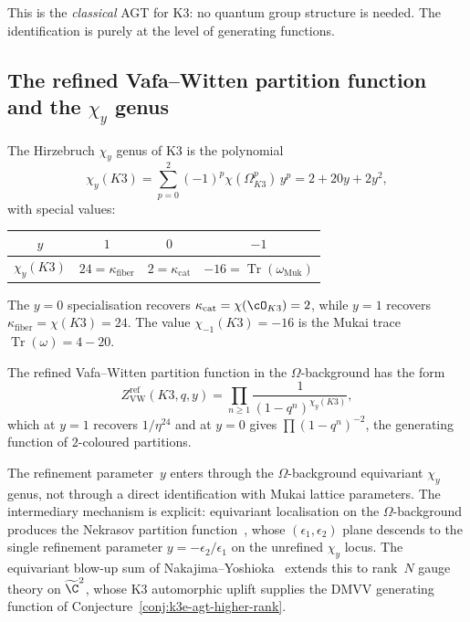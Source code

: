 \noindent This is the \emph{classical} AGT for K3: no quantum group structure is needed. The identification is purely at the level of generating functions.

\subsection{The refined Vafa--Witten partition function and the \texorpdfstring{$\chi_y$}{chi-y} genus}
\label{subsec:k3e-refined-vw}

The Hirzebruch $\chi_y$ genus of K3 is the polynomial
\begin{equation}\label{eq:k3e-chi-y}
 \chi_y(K3) = \sum_{p=0}^{2} (-1)^p \chi(\Omega^p_{K3}) \, y^p
 = 2 + 20y + 2y^2,
\end{equation}
with special values:
\begin{center}
\begin{tabular}{c|ccc}
$y$ & $1$ & $0$ & $-1$ \\ \hline
$\chi_y(K3)$ & $24 = \kappa_{\mathrm{fiber}}$ & $2 = \kappa_{\mathrm{cat}}$ & $-16 = \operatorname{Tr}(\omega_{\mathrm{Muk}})$
\end{tabular}
\end{center}
The $y = 0$ specialisation recovers $\kappa_{\mathrm{cat}} = \chi(\cO_{K3}) = 2$, while $y = 1$ recovers $\kappa_{\mathrm{fiber}} = \chi(K3) = 24$. The value $\chi_{-1}(K3) = -16$ is the Mukai trace $\operatorname{Tr}(\omega) = 4 - 20$.

The refined Vafa--Witten partition function in the $\Omega$-background has the form
\[
 Z_{\mathrm{VW}}^{\mathrm{ref}}(K3, q, y) = \prod_{n \geq 1} \frac{1}{(1 - q^n)^{\chi_y(K3)}},
\]
which at $y = 1$ recovers $1/\eta^{24}$ and at $y = 0$ gives $\prod(1-q^n)^{-2}$, the generating function of $2$-coloured partitions.

\begin{remark}
\label{rem:k3e-omega-background}
The refinement parameter~$y$ enters through the $\Omega$-background
equivariant $\chi_y$ genus, not through a direct identification with
Mukai lattice parameters. The intermediary mechanism is explicit:
equivariant localisation on the $\Omega$-background produces the
Nekrasov partition function~\cite{NekrasovOkounkov2003}, whose
$(\epsilon_1, \epsilon_2)$ plane descends to the single refinement
parameter $y = -\epsilon_2/\epsilon_1$ on the unrefined $\chi_y$
locus. The equivariant blow-up sum of
Nakajima--Yoshioka~\cite{NakajimaYoshioka2003a,NakajimaYoshioka2003b}
extends this to rank~$N$ gauge theory on $\widetilde{\C}^2$, whose K3
automorphic uplift supplies the DMVV generating function of
Conjecture~\ref{conj:k3e-agt-higher-rank}.
\end{remark}

